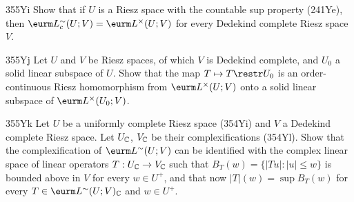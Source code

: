 {\spheader 355Yi Show that if $U$ is a Riesz space with the countable sup
property
(241Ye), then $\eurm L^{\sim}_c(U;V)=\eurm L^{\times}(U;V)$ for every
Dedekind complete Riesz space $V$.

\spheader 355Yj Let $U$ and $V$ be Riesz spaces, of which $V$ is
Dedekind complete, and $U_0$ a solid linear subspace of $U$.   Show that
the map $T\mapsto T\restr U_0$ is an order-continuous Riesz homomorphism
from $\eurm L^{\times}(U;V)$ onto a solid linear subspace of
$\eurm L^{\times}(U_0;V)$.

\spheader 355Yk Let $U$ be a uniformly complete Riesz space (354Yi) and
$V$ a Dedekind complete Riesz space.   Let $U_{\Bbb C}$, $V_{\Bbb C}$ be
their complexifications (354Yl).   Show that the complexification of
$\eurm L^{\sim}(U;V)$ can be identified with the complex linear space of
linear operators $T:U_{\Bbb C}\to V_{\Bbb C}$ such that
$B_T(w)=\{|Tu|:|u|\le w\}$ is bounded above in $V$ for every $w\in U^+$,
and that now $|T|(w)=\sup B_T(w)$ for every
$T\in\eurm L^{\sim}(U;V)_{\Bbb C}$ and $w\in U^+$.
}%

